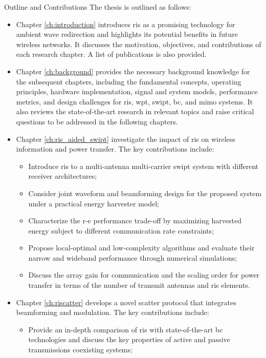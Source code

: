 \begin{section}{Outline and Contributions}
	The thesis is outlined as follows:
	\begin{itemize}
		\item Chapter \ref{ch:introduction} introduces \gls{ris} as a promising technology for ambient wave redirection and highlights its potential benefits in future wireless networks. It discusses the motivation, objectives, and contributions of each research chapter. A list of publications is also provided.
		\item Chapter \ref{ch:background} provides the necessary background knowledge for the subsequent chapters, including the fundamental concepts, operating principles, hardware implementation, signal and system models, performance metrics, and design challenges for \gls{ris}, \gls{wpt}, \gls{swipt}, \gls{bc}, and \gls{mimo} systems. It also reviews the state-of-the-art research in relevant topics and raise critical questions to be addressed in the following chapters.
		\item Chapter \ref{ch:ris_aided_swipt} investigate the impact of \gls{ris} on wireless information and power transfer. The key contributions include:
		\begin{itemize}
			\item Introduce \gls{ris} to a multi-antenna multi-carrier \gls{swipt} system with different receiver architectures;
			\item Consider joint waveform and beamforming design for the proposed system under a practical energy harvester model;
			\item Characterize the \gls{r-e} performance trade-off by maximizing harvested energy subject to different communication rate constraints;
			\item Propose local-optimal and low-complexity algorithms and evaluate their narrow and wideband performance through numerical simulations;
			\item Discuss the array gain for communication and the scaling order for power transfer in terms of the number of transmit antennas and \gls{ris} elements.
		\end{itemize}
		\item Chapter \ref{ch:riscatter} develops a novel scatter protocol that integrates beamforming and modulation. The key contributions include:
		\begin{itemize}
			\item Provide an in-depth comparison of \gls{ris} with state-of-the-art \gls{bc} technologies and discuss the key properties of active and passive transmissions coexisting systems;

\end{itemize}
\end{itemize}
\end{section}
